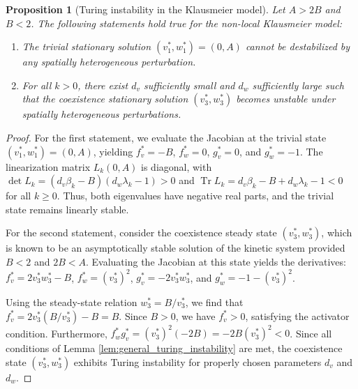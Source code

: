 \documentclass[11pt, a4paper]{article}
\theoremstyle{break}
\theoremstyle{break}
\newtheorem{prp}{Proposition}[section]
\theoremstyle{break}
\theoremstyle{break}
\theoremstyle{break}
\theoremstyle{break}
\theoremstyle{break}
\theoremstyle{break}
\theoremstyle{break}
\DeclareMathOperator{\Tr}{Tr}
\begin{document}
\begin{prp}[Turing instability in the Klausmeier model]
    \label{prp:klausmeier_instability}
    Let $A > 2B$ and $B < 2$. The following statements hold true for the non-local Klausmeier model:
    \begin{enumerate}
        \item The trivial stationary solution $(v_1^*, w_1^*) = (0, A)$ cannot be destabilized by any spatially heterogeneous perturbation.
        \item For all $k > 0$, there exist $d_v$ sufficiently small and $d_w$ sufficiently large such that the coexistence stationary solution $(v_3^*, w_3^*)$ becomes unstable under spatially heterogeneous perturbations.
    \end{enumerate}
\end{prp}

\begin{proof}
    For the first statement, we evaluate the Jacobian at the trivial state $(v_1^*, w_1^*) = (0, A)$, yielding $f_v^* = -B$, $f_w^* = 0$, $g_v^* = 0$, and $g_w^* = -1$. The linearization matrix $L_k(0, A)$ is diagonal, with $\det L_k = (d_v \beta_k - B)(d_w \lambda_k - 1) > 0$ and $\Tr L_k = d_v \beta_k - B + d_w \lambda_k - 1 < 0$ for all $k \geq 0$. Thus, both eigenvalues have negative real parts, and the trivial state remains linearly stable.
    
    For the second statement, consider the coexistence steady state $(v_3^*, w_3^*)$, which is known to be an asymptotically stable solution of the kinetic system provided $B < 2$ and $2B < A$. Evaluating the Jacobian at this state yields the derivatives: $f_v^* = 2v_3^* w_3^* - B$, $f_w^* = (v_3^*)^2$, $g_v^* = -2v_3^* w_3^*$, and $g_w^* = -1 - (v_3^*)^2$.
    
    Using the steady-state relation $w_3^* = B/v_3^*$, we find that $f_v^* = 2v_3^*(B/v_3^*) - B = B$. Since $B > 0$, we have $f_v^* > 0$, satisfying the activator condition. Furthermore, $f_w^* g_v^* = (v_3^*)^2 (-2B) = -2B(v_3^*)^2 < 0$. Since all conditions of Lemma \ref{lem:general_turing_instability} are met, the coexistence state $(v_3^*, w_3^*)$ exhibits Turing instability for properly chosen parameters $d_v$ and $d_w$.
\end{proof}



\end{document}
